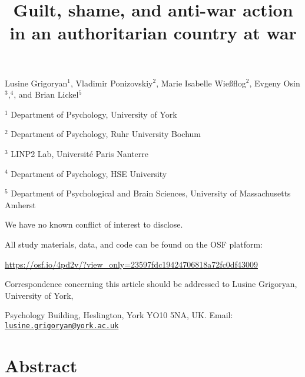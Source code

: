 \documentclass[
]{article}
\title{Guilt, shame, and anti-war action in an authoritarian country at war}
\author{}
\date{\vspace{-2.5em}}
\begin{document}
\maketitle


\vspace{10mm}
\begin{center}
Lusine Grigoryan$^{1}$, Vladimir Ponizovskiy$^{2}$, Marie Isabelle Wießflog$^{2}$, Evgeny Osin$^{3}$,$^{4}$, and Brian Lickel$^{5}$
\vspace{30mm}

$^{1}$ Department of Psychology, University of York
\vspace{5mm}

$^{2}$ Department of Psychology, Ruhr University Bochum
\vspace{5mm}

$^{3}$ LINP2 Lab, Université Paris Nanterre
\vspace{5mm}

$^{4}$ Department of Psychology, HSE University
\vspace{5mm}

$^{5}$ Department of Psychological and Brain Sciences, University of Massachusetts Amherst
\vspace{50mm}

\end{center}

\noindent We have no known conflict of interest to disclose.

\noindent All study materials, data, and code can be found on the OSF platform:

\noindent \url{https://osf.io/4pd2v/?view_only=23597fdc19424706818a72fc0df43009}

\noindent Correspondence concerning this article should be addressed to Lusine Grigoryan, University of York,

\noindent Psychology Building, Heslington, York YO10 5NA, UK. Email: \href{mailto:lusine.grigoryan@york.ac.uk}{\nolinkurl{lusine.grigoryan@york.ac.uk}}

\pagebreak

\hypertarget{abstract}{%
\section*{Abstract}\label{abstract}}
\end{document}
